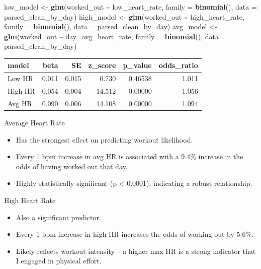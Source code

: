 \documentclass[
  11pt,
]{article}
\newenvironment{Shaded}{\begin{snugshade}}{\end{snugshade}}
\newcommand{\AttributeTok}[1]{\textcolor[rgb]{0.13,0.29,0.53}{#1}}
\newcommand{\FunctionTok}[1]{\textcolor[rgb]{0.13,0.29,0.53}{\textbf{#1}}}
\newcommand{\NormalTok}[1]{#1}
\newcommand{\OtherTok}[1]{\textcolor[rgb]{0.56,0.35,0.01}{#1}}
\newcommand{\SpecialCharTok}[1]{\textcolor[rgb]{0.81,0.36,0.00}{\textbf{#1}}}
\providecommand{\tightlist}{%
  \setlength{\itemsep}{0pt}\setlength{\parskip}{0pt}}
\begin{document}
\begin{Shaded}
\begin{Highlighting}[]
\NormalTok{low\_model }\OtherTok{\textless{}{-}} \FunctionTok{glm}\NormalTok{(worked\_out }\SpecialCharTok{\textasciitilde{}}\NormalTok{ low\_heart\_rate, }\AttributeTok{family =} \FunctionTok{binomial}\NormalTok{(), }\AttributeTok{data =}\NormalTok{ parsed\_clean\_by\_day)}
\NormalTok{high\_model }\OtherTok{\textless{}{-}} \FunctionTok{glm}\NormalTok{(worked\_out }\SpecialCharTok{\textasciitilde{}}\NormalTok{ high\_heart\_rate, }\AttributeTok{family =} \FunctionTok{binomial}\NormalTok{(), }\AttributeTok{data =}\NormalTok{ parsed\_clean\_by\_day)}
\NormalTok{avg\_model }\OtherTok{\textless{}{-}} \FunctionTok{glm}\NormalTok{(worked\_out }\SpecialCharTok{\textasciitilde{}}\NormalTok{ day\_avg\_heart\_rate, }\AttributeTok{family =} \FunctionTok{binomial}\NormalTok{(), }\AttributeTok{data =}\NormalTok{ parsed\_clean\_by\_day)}
\end{Highlighting}
\end{Shaded}

\begin{longtable}[]{@{}lrrrrr@{}}
\toprule\noalign{}
model & beta & SE & z\_score & p\_value & odds\_ratio \\
\midrule\noalign{}
\endhead
\bottomrule\noalign{}
\endlastfoot
Low HR & 0.011 & 0.015 & 0.730 & 0.46538 & 1.011 \\
High HR & 0.054 & 0.004 & 14.512 & 0.00000 & 1.056 \\
Avg HR & 0.090 & 0.006 & 14.108 & 0.00000 & 1.094 \\
\end{longtable}

Average Heart Rate

\begin{itemize}
\tightlist
\item
  Has the strongest effect on predicting workout likelihood.
\item
  Every 1 bpm increase in avg HR is associated with a 9.4\% increase in
  the odds of having worked out that day.
\item
  Highly statistically significant (p \textless{} 0.0001), indicating a
  robust relationship.
\end{itemize}

High Heart Rate

\begin{itemize}
\tightlist
\item
  Also a significant predictor.
\item
  Every 1 bpm increase in high HR increases the odds of working out by
  5.6\%.
\item
  Likely reflects workout intensity -- a higher max HR is a strong
  indicator that I engaged in physical effort.
\end{itemize}
\end{document}
